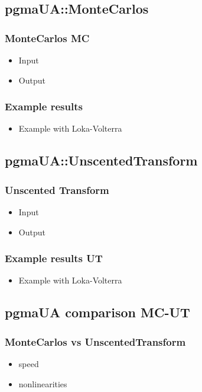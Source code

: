 \documentclass[]{beamer}
\begin{document}
\subsection{pgmaUA::MonteCarlos}
\begin{frame}
  \frametitle{MonteCarlos MC}
  \begin{itemize}
  \item Input
  \item Output
  \end{itemize}
\end{frame}
\begin{frame}
  \frametitle{Example results}
  \begin{itemize}
  \item Example with Loka-Volterra
  \end{itemize}
\end{frame}
\subsection{pgmaUA::UnscentedTransform}
\begin{frame}
  \frametitle{Unscented Transform}
  \begin{itemize}
  \item Input
  \item Output
  \end{itemize}
\end{frame}
\begin{frame}
  \frametitle{Example results UT}
  \begin{itemize}
  \item Example with Loka-Volterra
  \end{itemize}
\end{frame}
\subsection{pgmaUA comparison MC-UT}
\begin{frame}
  \frametitle{MonteCarlos vs UnscentedTransform}
  \begin{itemize}
  \item speed
  \item nonlinearities
  \end{itemize}
\end{frame}

\end{document}
